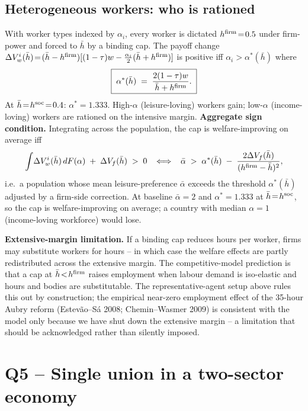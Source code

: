 \documentclass[9pt,a4paper]{extarticle}
\begin{document}
\subsection{Heterogeneous workers: who is rationed}
With worker types indexed by $\alpha_i$, every worker is dictated
$h^{\rm firm}\!=\!0.5$ under firm-power and forced to $\bar h$ by a
binding cap. The payoff change
$\Delta V_w^i(\bar h)\!=\!(\bar h - h^{\rm firm})[(1-\tau)w-\tfrac{\alpha_i}{2}(\bar h+h^{\rm firm})]$
is positive iff $\alpha_i\!>\!\alpha^\ast(\bar h)$ where
\begin{equation}
\boxed{\;\alpha^\ast(\bar h)\;=\;\frac{2(1-\tau)w}{\bar h + h^{\rm firm}}.\;}
\label{eq:alpha-threshold}
\end{equation}
At $\bar h\!=\!h^{\rm soc}\!=\!0.4$: $\alpha^\ast\!=\!1.333$.
High-$\alpha$ (leisure-loving) workers gain; low-$\alpha$
(income-loving) workers are rationed on the intensive margin.
\textbf{Aggregate sign condition.} Integrating across the population,
the cap is welfare-improving on average iff
\[
\int\!\Delta V_w^i(\bar h)\,dF(\alpha)\;+\;\Delta V_f(\bar h)\;>\;0
\;\;\iff\;\;
\bar\alpha\;>\;\alpha^\ast(\bar h)\;-\;\frac{2\Delta V_f(\bar h)}{(h^{\rm firm}-\bar h)^2},
\]
i.e.\ a population whose mean leisure-preference $\bar\alpha$ exceeds
the threshold $\alpha^\ast(\bar h)$ adjusted by a firm-side
correction. At baseline $\bar\alpha\!=\!2$ and
$\alpha^\ast\!=\!1.333$ at $\bar h\!=\!h^{\rm soc}$, so the cap is
welfare-improving on average; a country with median $\alpha\!=\!1$
(income-loving workforce) would lose.

\textbf{Extensive-margin limitation.} If a binding cap reduces hours
per worker, firms may substitute workers for hours -- in which case
the welfare effects are partly redistributed across the extensive
margin. The competitive-model prediction is that a cap at
$\bar h\!<\!h^{\rm firm}$ raises employment when labour demand is
iso-elastic and hours and bodies are substitutable. The
representative-agent setup above rules this out by construction; the
empirical near-zero employment effect of the 35-hour Aubry reform
(Estev\~ao--S\'a 2008; Chemin--Wasmer 2009) is consistent with the
model only because we have shut down the extensive margin -- a
limitation that should be acknowledged rather than silently imposed.

\section{Q5 -- Single union in a two-sector economy}
\end{document}
